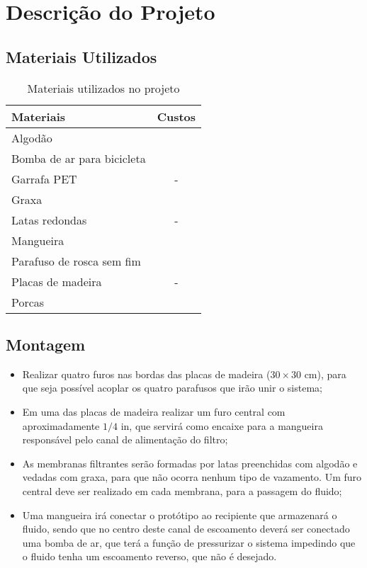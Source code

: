 \chapter{Descrição do Projeto}\label{descricao}

\section{Materiais Utilizados}

\begin{table}[H]
\centering
\caption{Materiais utilizados no projeto}
\label{tab:materiais}
\begin{tabular}{lc}
\textbf{Materiais}         & \multicolumn{1}{l}{\textbf{Custos}} \\ \toprule
Algodão                    &                                     \\
Bomba de ar para bicicleta &                                     \\
Garrafa PET                & -                                   \\
Graxa                      &                                     \\
Latas redondas             & -                                   \\
Mangueira                  &                                     \\
Parafuso de rosca sem fim  &                                     \\
Placas de madeira          & -                                   \\
  Porcas                   &                                     \\ \bottomrule
\end{tabular}
\end{table}

\section{Montagem}
\label{sec:montagem}

\begin{itemize}
\item Realizar quatro furos nas bordas das placas de madeira ($30\times30$ \si{cm}),
  para que seja possível acoplar os quatro parafusos que irão unir o sistema;
\item Em uma das placas de madeira realizar um furo central com aproximadamente
  $1/4$ \si{in}, que servirá como encaixe para a mangueira responsável pelo canal de
  alimentação do filtro;
\item As membranas filtrantes serão formadas por latas preenchidas com algodão e
  vedadas com graxa, para que não ocorra nenhum tipo de vazamento. Um furo
  central deve ser realizado em cada membrana, para a passagem do fluido;
\item Uma mangueira irá conectar o protótipo ao recipiente que armazenará o
  fluido, sendo que no centro deste canal de escoamento deverá ser conectado
  uma bomba de ar, que terá a função de pressurizar o sistema impedindo que o
  fluido tenha um escoamento reverso, que não é desejado.
\end{itemize}

